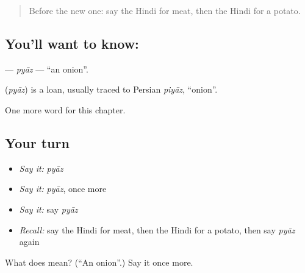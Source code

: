 \label{lesson:HI-C137-pyaz}



\begin{quote}
Before the new one: say the Hindi for meat, then the Hindi for a potato.
\end{quote}

\subsection*{You'll want to know: }
\textbf{} — \emph{pyāz} — \textquotedblleft{}an onion\textquotedblright{}.

\begin{cousinweb}
\textbf{} (\emph{pyāz}) is a loan, usually traced to Persian \emph{piyāz}, \textquotedblleft{}onion\textquotedblright{}.
\end{cousinweb}

\begin{grammarlens}[title={What you've built}]
One more word for this chapter.
\end{grammarlens}

\subsection*{Your turn}
\begin{itemize}
\raggedright
  \item \emph{Say it:} \emph{pyāz}
  \item \emph{Say it:} \emph{pyāz}, once more
  \item \emph{Say it:} say \emph{pyāz}
  \item \emph{Recall:} say the Hindi for meat, then the Hindi for a potato, then say \emph{pyāz} again
\end{itemize}

\begin{tcolorbox}[breakable,colback=teal!4,colframe=teal!35!black,title={Before you move on}]
What does  mean? (\textquotedblleft{}An onion\textquotedblright{}.) Say it once more.
\end{tcolorbox}
